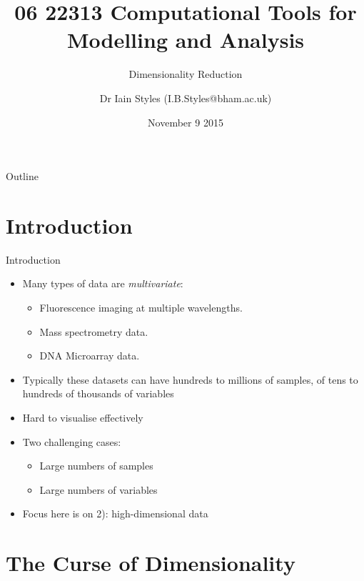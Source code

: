 \documentclass{beamer}
\title{06 22313 Computational Tools for Modelling and Analysis}
\subtitle{Dimensionality Reduction}
\author{Dr Iain Styles (I.B.Styles@bham.ac.uk)}
\institute{School of Computer Science, University of Birmingham}
\date{November 9 2015}
\begin{document}
\begin{frame}
  \titlepage
\end{frame}

\begin{frame}{Outline}
  \tableofcontents
\end{frame}

\section{Introduction}
\begin{frame}{Introduction}
  \begin{itemize}
    \item Many types of data are \textit{multivariate}:
    \begin{itemize}
      \item Fluorescence imaging at multiple wavelengths.
      \item Mass spectrometry data.
      \item DNA Microarray data.
    \end{itemize}
    \item Typically these datasets can have hundreds to millions of samples, of tens to hundreds of thousands of variables
    \item Hard to visualise effectively
    \item Two challenging cases:
    \begin{itemize}
      \item[1)] Large numbers of samples
      \item[2)] Large numbers of variables
    \end{itemize}
    \item Focus here is on 2): high-dimensional data
  \end{itemize}
\end{frame}

\section{The Curse of Dimensionality}
\end{document}
